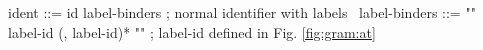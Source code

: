 \begin{syntax}
  ident ::= id label-binders ; normal identifier with labels
  \
  label-binders ::= "{" label-id (, label-id)* "}" ; label-id defined in Fig. \ref{fig:gram:at}
\end{syntax}
